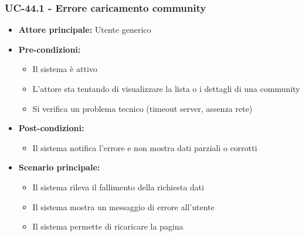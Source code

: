 \documentclass[a4paper,12pt]{article}
\begin{document}
\subsubsection{UC-44.1 - Errore caricamento community} \label{subsec:UC-44.1}
\begin{itemize}
    \item \textbf{Attore principale:} Utente generico
    \item \textbf{Pre-condizioni:}
    \begin{itemize}
        \item Il sistema è attivo
        \item L'attore sta tentando di visualizzare la lista o i dettagli di una community
        \item Si verifica un problema tecnico (timeout server, assenza rete)
    \end{itemize}
    \item \textbf{Post-condizioni:}
    \begin{itemize}
        \item Il sistema notifica l'errore e non mostra dati parziali o corrotti
    \end{itemize}
    \item \textbf{Scenario principale:} 
    \begin{itemize}
        \item Il sistema rileva il fallimento della richiesta dati
        \item Il sistema mostra un messaggio di errore all'utente
        \item Il sistema permette di ricaricare la pagina
    \end{itemize}
\end{itemize}
\end{document}
